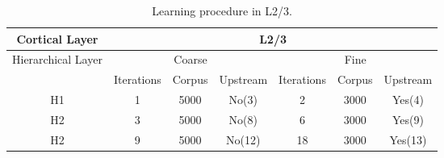 \documentclass[11pt,a4paper]{article}
\begin{document}
\begin{appendices}
\begin{table}[h!]
\centering
\begin{tabular}{ |c|c|c|c|c|c|c| }
\hline
\scriptsize{Cortical Layer} & \multicolumn{6}{|c|}{L2/3} \\
\hline
\scriptsize{Hierarchical Layer} & \multicolumn{3}{|c|}{\scriptsize{Coarse}} & \multicolumn{3}{|c|}{\scriptsize{Fine}}\\
\hline
 & \scriptsize{Iterations} & \scriptsize{Corpus} & \scriptsize{Upstream} & \scriptsize{Iterations} & \scriptsize{Corpus} & \scriptsize{Upstream}\\
\hline
H1 & 1 & 5000 & No(3) & 2 & 3000 & Yes(4)\\
\hline
H2 & 3 & 5000 & No(8) & 6 & 3000 & Yes(9)\\
\hline
H2 & 9 & 5000 & No(12) & 18 & 3000 & Yes(13)\\
\hline
\end{tabular}
\caption{Learning procedure in L2/3.}
\label{l23}
\end{table}

\end{appendices}


\printacronyms[include-classes=abbrev,name=Abbreviations]

\printacronyms[include-classes=nomencl,name=Nomenclature]
\end{document}
